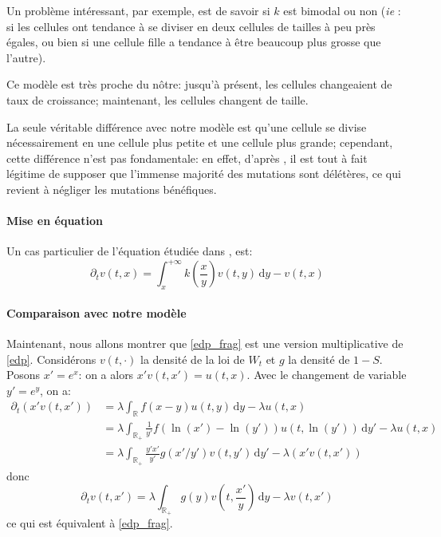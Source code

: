 \documentclass[12pt]{article}
\newcommand{\pth}[1]{\left(#1\right)}
\newcommand{\ie}{\emph{ie} }
\newcommand{\Er}{\mathbb{R}}
\newcommand{\de}{\,\mathrm{d}}
\newcommand{\dr}{\partial}
\begin{document}
Un problème intéressant, par exemple, est de savoir si $k$ est bimodal ou non (\ie: si les cellules ont tendance à se diviser en deux cellules de tailles à peu près égales, ou bien si une cellule fille a tendance à être beaucoup plus grosse que l'autre).

Ce modèle est très proche du nôtre: jusqu'à présent, les cellules changeaient de taux de croissance; maintenant, les cellules changent de taille.

La seule véritable différence avec notre modèle est qu'une cellule se divise nécessairement en une cellule plus petite et une cellule plus grande; cependant, cette différence n'est pas fondamentale: en effet, d'après \cite{rob}, il est tout à fait légitime de supposer que l'immense majorité des mutations sont délétères, ce qui revient à négliger les mutations bénéfiques.

\paragraph{Mise en équation} 

Un cas particulier de l'équation étudiée dans \cite{md1}, \cite{md2} est:
\begin{equation}\label{edp_frag}
\dr_tv(t,x)=\int_x^{+\infty}k\pth{\frac{x}{y}}v(t,y)\de y-v(t,x)
\end{equation}


\paragraph{Comparaison avec notre modèle}

Maintenant, nous allons montrer que \eqref{edp_frag} est une version multiplicative de \eqref{edp}.  Considérons $v(t,\cdot)$ la densité de la loi de $W_t$ et $g$ la densité de $1-S$. Posons $x'=e^x$: on a alors $x'v(t,x')=u(t,x)$. Avec le changement de variable $y'=e^y$, on a:
\begin{align*}
  \dr_t(x'v(t,x'))
  &=\lambda\int_{\Er}f(x-y)u(t,y)\de y-\lambda u(t,x)\\
  &=\lambda\int_{\Er_+}\frac{1}{y'}f(\ln(x')-\ln(y'))u(t,\ln(y'))\de y'-\lambda u(t,x)\\
  &=\lambda\int_{\Er_+}\frac{y'x'}{y'}g(x'/y')v\pth{t,y'}\de y'-\lambda\pth{x'v(t,x')}
\end{align*}
donc 
\[\dr_tv(t,x')=\lambda\int_{\Er_+}g(y)v\pth{t,\frac{x'}{y}}\de y-\lambda v(t,x')\]
ce qui est équivalent à \eqref{edp_frag}.
\end{document}

